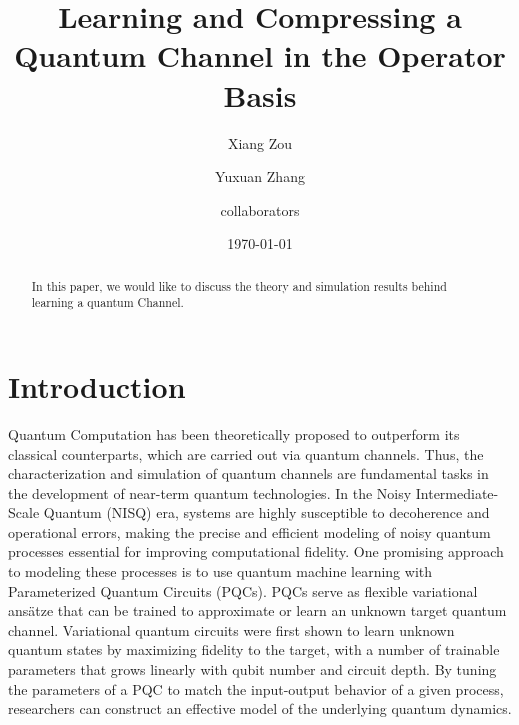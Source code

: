 \documentclass[%
 reprint,
superscriptaddress,
 amsmath,amssymb,
 aps,
]{revtex4-2}
\begin{document}

\title{Learning and Compressing a Quantum Channel in the Operator Basis}%

\author{Xiang Zou}
%
\author{Yuxuan Zhang}%
%
\author{collaborators}%
%
\date{\today}%

\begin{abstract}
In this paper, we would like to discuss the theory and simulation results behind learning a quantum Channel.
\end{abstract}

\maketitle


\section{Introduction}

Quantum Computation has been theoretically proposed to outperform its classical counterparts, which are carried out via quantum channels. Thus, the characterization and simulation of quantum channels are fundamental tasks in the development of near-term quantum technologies. In the Noisy Intermediate-Scale Quantum (NISQ) era, systems are highly susceptible to decoherence and operational errors, making the precise and efficient modeling of noisy quantum processes essential for improving computational fidelity. One promising approach to modeling these processes is to use quantum machine learning with Parameterized Quantum Circuits (PQCs). PQCs serve as flexible variational ansätze that can be trained to approximate or learn an unknown target quantum channel. Variational quantum circuits were first shown to learn unknown quantum states by maximizing fidelity to the target, with a number of trainable parameters that grows linearly with qubit number and circuit depth. By tuning the parameters of a PQC to match the input-output behavior of a given process, researchers can construct an effective model of the underlying quantum dynamics.
\end{document}
